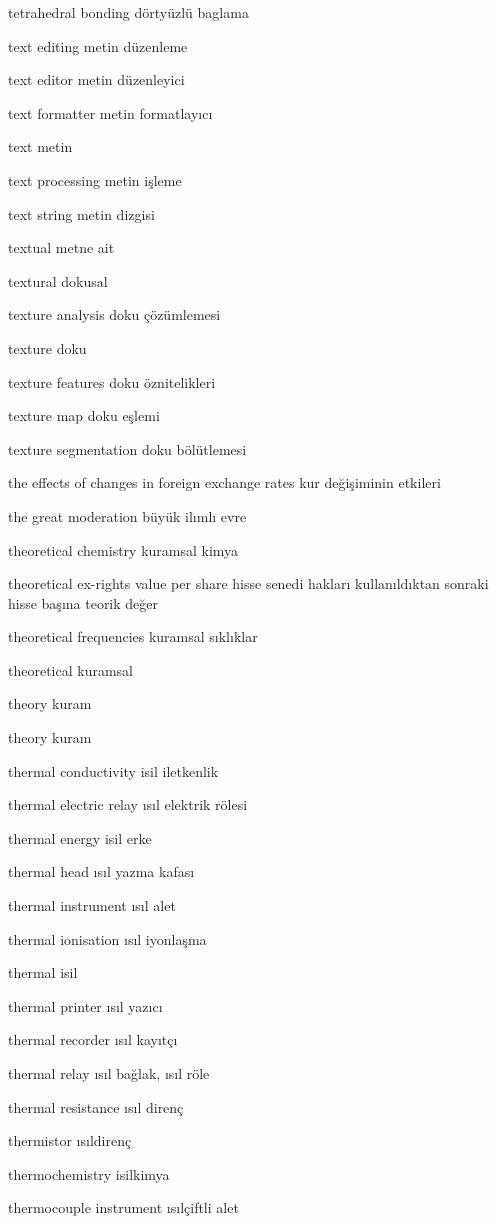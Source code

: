 \documentclass[12pt,fleqn]{article}\usepackage{../../common}
\begin{document}
tetrahedral bonding dörtyüzlü baglama

text editing metin düzenleme

text editor metin düzenleyici

text formatter metin formatlayıcı

text metin

text processing metin işleme

text string metin dizgisi

textual metne ait

textural dokusal

texture analysis doku çözümlemesi

texture doku

texture features doku öznitelikleri

texture map doku eşlemi

texture segmentation doku bölütlemesi

the effects of changes in foreign exchange rates kur değişiminin etkileri

the great moderation büyük ilımlı evre

theoretical chemistry kuramsal kimya

theoretical ex-rights value per share hisse senedi hakları kullanıldıktan sonraki hisse başına teorik değer

theoretical frequencies kuramsal sıklıklar

theoretical kuramsal

theory kuram

theory kuram

thermal conductivity isil iletkenlik

thermal electric relay ısıl elektrik rölesi

thermal energy isil erke

thermal head ısıl yazma kafası

thermal instrument ısıl alet

thermal ionisation ısıl iyonlaşma

thermal isil

thermal printer ısıl yazıcı

thermal recorder ısıl kayıtçı

thermal relay ısıl bağlak, ısıl röle

thermal resistance ısıl direnç

thermistor ısıldirenç

thermochemistry isilkimya

thermocouple instrument ısılçiftli alet
\end{document}
